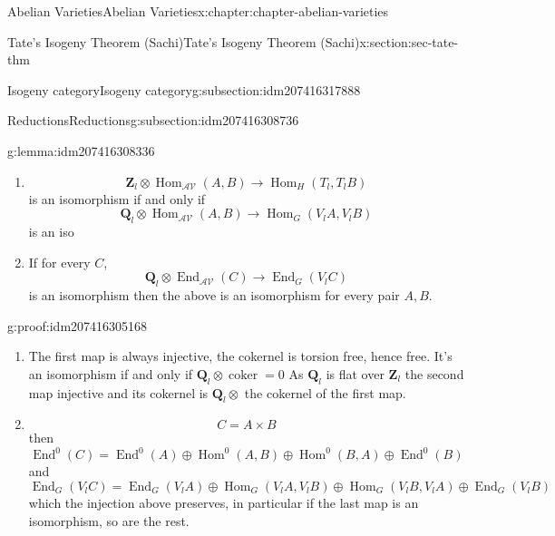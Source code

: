 \documentclass[oneside,10pt,]{book}
\numberwithin{equation}{section}
\newcommand{\ZZ}{\mathbf{Z}}
\newcommand{\QQ}{\mathbf{Q}}
\newcommand{\cat}[1]{\mathcal{#1}}
\DeclareMathOperator{\coker}{coker}
\DeclareMathOperator{\End}{End}
\DeclareMathOperator{\Hom}{Hom}
\begin{document}
\begin{chapterptx}{Abelian Varieties}{}{Abelian Varieties}{}{}{x:chapter:chapter-abelian-varieties}
\begin{sectionptx}{Tate's Isogeny Theorem (Sachi)}{}{Tate's Isogeny Theorem (Sachi)}{}{}{x:section:sec-tate-thm}
\begin{subsectionptx}{Isogeny category}{}{Isogeny category}{}{}{g:subsection:idm207416317888}
\begin{enumerate}
\end{enumerate}
%
\end{subsectionptx}
%
%
\typeout{************************************************}
\typeout{************************************************}
%
\begin{subsectionptx}{Reductions}{}{Reductions}{}{}{g:subsection:idm207416308736}
\begin{lemma}{}{}{g:lemma:idm207416308336}%
%
\begin{enumerate}
\item{}%
\begin{equation*}
\ZZ_l \otimes \Hom_\cat{AV} (A,B) \to \Hom_H(T_l, T_lB)
\end{equation*}
is an isomorphism if and only if%
\begin{equation*}
\QQ_l \otimes \Hom_\cat{AV} (A,B) \to \Hom_G(V_l A, V_l B)
\end{equation*}
is an iso%
\item{}If for every \(C\),%
\begin{equation*}
\QQ_l \otimes \End_\cat{AV} (C) \to \End_G(V_l C)
\end{equation*}
is an isomorphism then the above is an isomorphism for every pair \(A,B\).%
\end{enumerate}
%
\end{lemma}
\begin{proofptx}{}{g:proof:idm207416305168}
%
\begin{enumerate}
\item{}The first map is always injective, the cokernel is torsion free, hence free. It's an isomorphism if and only if \(\QQ_l \otimes \coker = 0\) As \(\QQ_l\) is flat over \(\ZZ_l\) the second map injective and its cokernel is \(\QQ_l \otimes\) the cokernel of the first map.%
\item{}%
\begin{equation*}
C = A\times B
\end{equation*}
then%
\begin{equation*}
\End^0(C) = \End^0(A)\oplus \Hom^0(A,B) \oplus \Hom^0(B,A) \oplus \End^0(B)
\end{equation*}
and%
\begin{equation*}
\End_G(V_lC) = \End_G(V_lA)\oplus \Hom_G(V_lA,V_lB) \oplus \Hom_G(V_lB,V_lA) \oplus \End_G(V_lB)
\end{equation*}
which the injection above preserves, in  particular if the last map is an isomorphism, so are the rest.%
\end{enumerate}

\end{proofptx}
\end{subsectionptx}
\end{sectionptx}
\end{chapterptx}
\end{document}
